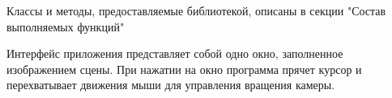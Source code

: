 Классы и методы, предоставляемые библиотекой, описаны в секции "Состав выполняемых функций"

Интерфейс приложения представляет собой одно окно, заполненное изображением сцены. При нажатии на окно программа прячет курсор и перехватывает движения мыши для управления вращения камеры.